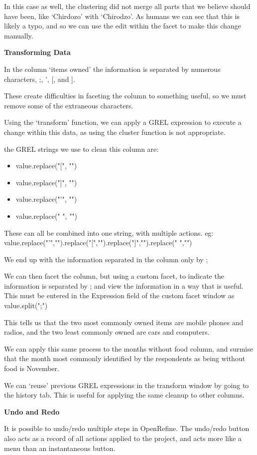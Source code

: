 \documentclass{article}
\begin{document}
In this case as well, the clustering did not merge all parts that we believe should have been, like  `Chirdozo' with `Chirodzo'. As humans we can see that this is likely a typo, and so we can use the edit within the facet to make this change manually.

\textbf{Transforming Data}

In the column `items owned' the information is separated by numerous characters, ;, ', [, and ].

These create difficulties in faceting the column to something useful, so we must remove some of the extraneous characters. 

Using the `transform' function, we can apply a GREL expression to execute a change within this data, as using the cluster function is not appropriate.

the GREL strings we use to clean this column are:
\begin{itemize}
    \item value.replace("[", "")
    \item value.replace("]", "")
    \item value.replace("'", "")
    \item value.replace(" ", "")
\end{itemize}

These can all be combined into one string, with multiple actions. eg: value.replace("'","").replace("[","").replace("]","").replace(" ","") 

We end up with the information separated in the column only by ;

We can then facet the column, but using a custom facet, to indicate the information is separated by ; and view the information in a way that is useful. This must be entered in the Expression field of the custom facet window as value.split(";")

This tells us that the two most commonly owned items are mobile phones and radios, and the two least commonly owned are cars and computers.

We can apply this same process to the months without food column, and surmise that the month most commonly identified by the respondents as being without food is November.

We can `reuse' previous GREL expressions in the transform window by going to the history tab. This is useful for applying the same cleanup to other columns.

\textbf{Undo and Redo}

It is possible to undo/redo multiple steps in OpenRefine. The undo/redo button also acts as a record of all actions applied to the project, and acts more like a menu than an instantaneous button.
\end{document}
